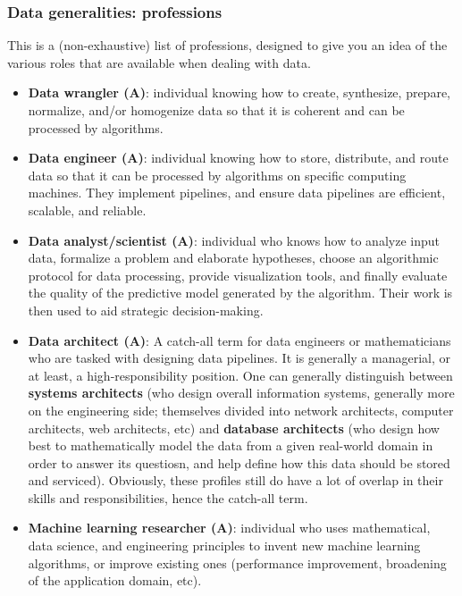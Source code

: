 \documentclass{article}
\begin{document}
\subsubsection*{Data generalities: professions}

This is a (non-exhaustive) list of professions, designed to give you an idea of the various roles that are available when dealing with data.

\begin{itemize}

	\item \textbf{Data wrangler (A)}: individual knowing how to create, synthesize, prepare, normalize, and/or homogenize data so that it is coherent and can be processed by algorithms.

	\item \textbf{Data engineer (A)}: individual knowing how to store, distribute, and route data so that it can be processed by algorithms on specific computing machines. They implement pipelines, and ensure data pipelines are efficient, scalable, and reliable.

	\item \textbf{Data analyst/scientist (A)}: individual who knows how to analyze input data, formalize a problem and elaborate hypotheses, choose an algorithmic protocol for data processing, provide visualization tools, and finally evaluate the quality of the predictive model generated by the algorithm. Their work is then used to aid strategic decision-making.

	\item \textbf{Data architect (A)}: A catch-all term for data engineers or mathematicians who are tasked with designing data pipelines. It is generally a managerial, or at least, a high-responsibility position. One can generally distinguish between \textbf{systems architects} (who design overall information systems, generally more on the engineering side; themselves divided into network architects, computer architects, web architects, etc) and \textbf{database architects} (who design how best to mathematically model the data from a given real-world domain in order to answer its questiosn, and help define how this data should be stored and serviced). Obviously, these profiles still do have a lot of overlap in their skills and responsibilities, hence the catch-all term.

	\item \textbf{Machine learning researcher (A)}: individual who uses mathematical, data science, and engineering principles to invent new machine learning algorithms, or improve existing ones (performance improvement, broadening of the application domain, etc).


\end{itemize}
\end{document}
